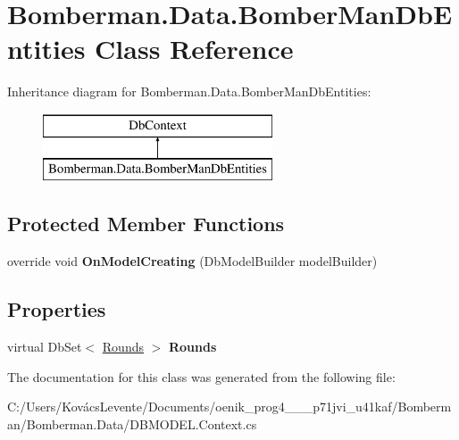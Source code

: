 \hypertarget{class_bomberman_1_1_data_1_1_bomber_man_db_entities}{}\section{Bomberman.\+Data.\+Bomber\+Man\+Db\+Entities Class Reference}
\label{class_bomberman_1_1_data_1_1_bomber_man_db_entities}
Inheritance diagram for Bomberman.\+Data.\+Bomber\+Man\+Db\+Entities\+:\begin{figure}[H]
\begin{center}
\leavevmode
\includegraphics[height=2.000000cm]{class_bomberman_1_1_data_1_1_bomber_man_db_entities}
\end{center}
\end{figure}
\subsection*{Protected Member Functions}
\begin{DoxyCompactItemize}
\item 
\mbox{\label{class_bomberman_1_1_data_1_1_bomber_man_db_entities_aa5e3a63f6886303f5f753f85dde48ef6}} 
override void {\bfseries On\+Model\+Creating} (Db\+Model\+Builder model\+Builder)
\end{DoxyCompactItemize}
\subsection*{Properties}
\begin{DoxyCompactItemize}
\item 
\mbox{\label{class_bomberman_1_1_data_1_1_bomber_man_db_entities_a2439afe866955a0c9d5818a786e1f24b}} 
virtual Db\+Set$<$ \mbox{\hyperlink{class_bomberman_1_1_data_1_1_rounds}{Rounds}} $>$ {\bfseries Rounds}
\end{DoxyCompactItemize}


The documentation for this class was generated from the following file\+:\begin{DoxyCompactItemize}
\item 
C\+:/\+Users/\+Kovács\+Levente/\+Documents/oenik\+\_\+prog4\+\_\+\_\+\_\+p71jvi\+\_\+u41kaf/\+Bomberman/\+Bomberman.\+Data/D\+B\+M\+O\+D\+E\+L.\+Context.\+cs\end{DoxyCompactItemize}
